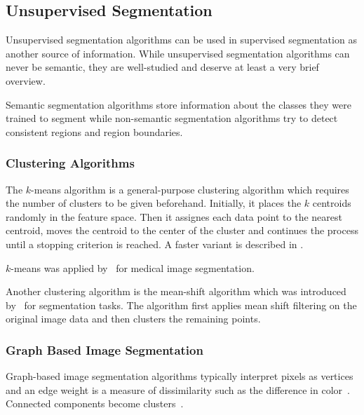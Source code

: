 
\subsection{Unsupervised Segmentation}%
\label{subsec:unsupervised-traditional-segmentation}%

Unsupervised segmentation algorithms can be used in supervised segmentation as
another source of information. While unsupervised segmentation algorithms can
never be semantic, they are well-studied and deserve at least a very brief
overview.

Semantic segmentation algorithms store information about the classes they were
trained to segment while non-semantic segmentation algorithms try to detect
consistent regions and region boundaries.

\subsubsection{Clustering Algorithms}
The $k$-means algorithm is a general-purpose clustering algorithm which
requires the number of clusters to be given beforehand. Initially, it places
the $k$ centroids randomly in the feature space. Then it assignes each
data point to the nearest centroid, moves the centroid to the center of the
cluster and continues the process until a stopping criterion is reached. A
faster variant is described in \cite{hartigan1975clustering}.

$k$-means was applied by~\cite{chen1998image} for medical image segmentation.

Another clustering algorithm is the mean-shift algorithm which was introduced
by~\cite{comaniciu2002mean} for segmentation tasks. The algorithm first applies
mean shift filtering on the original image data and then clusters the remaining
points.



\subsubsection{Graph Based Image Segmentation}%
\label{subsec:graph-based-image-segmentation}%
Graph-based image segmentation algorithms typically interpret pixels as
vertices and an edge weight is a measure of dissimilarity such as the
difference in color~\cite{felzenszwalb2004efficient,FelzenszwalbGraphCode}.
Connected components become clusters~\cite{pantofaru2005comparison}.

